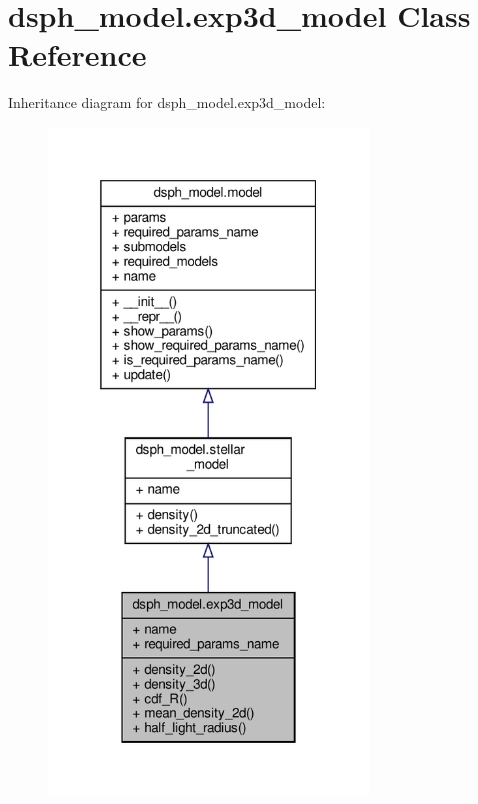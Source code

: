 \hypertarget{classdsph__model_1_1exp3d__model}{}\section{dsph\+\_\+model.\+exp3d\+\_\+model Class Reference}
\label{classdsph__model_1_1exp3d__model}


Inheritance diagram for dsph\+\_\+model.\+exp3d\+\_\+model\+:\nopagebreak
\begin{figure}[H]
\begin{center}
\leavevmode
\includegraphics[width=241pt]{d0/de0/classdsph__model_1_1exp3d__model__inherit__graph}
\end{center}
\end{figure}


